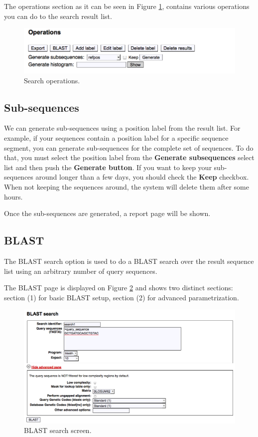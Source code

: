 The operations section as it can be seen in Figure \ref{fig:search2_man}, contains various operations
you can do to the search result list.

\begin{figure}[H]
  \centering
    \includegraphics[scale=0.5]{search2.png}
  \caption{Search operations.}
  \label{fig:search2_man}
\end{figure}

\subsection{Sub-sequences}

We can generate sub-sequences using a position label from the result list. For example,
if your sequences contain a position label for a specific sequence segment, you can generate
sub-sequences for the complete set of sequences. To do that, you must select the position label
from the \textbf{Generate subsequences} select list and then push the \textbf{Generate button}.
If you want to keep your sub-sequences around longer than a few days, you should check the \textbf{Keep}
checkbox. When not keeping the sequences around, the system will delete them after some hours.

Once the sub-sequences are generated, a report page will be shown.

\subsection{BLAST}

The BLAST search option is used to do a BLAST search
over the result sequence list using an arbitrary number of 
query sequences.

The BLAST page is displayed on Figure \ref{fig:blast2} and shows two distinct
sections: section (1) for basic BLAST setup, section (2) for advanced parametrization.

\begin{figure}[ht]
  \centering
    \includegraphics[scale=0.45]{blast.png}
  \caption{BLAST search screen.}
  \label{fig:blast2}
\end{figure}

